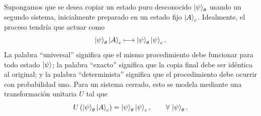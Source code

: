 \documentclass[12pt,a4paper]{article}
\theoremstyle{definition}
\theoremstyle{plain}
\theoremstyle{remark}
\begin{document}
Supongamos que se desea copiar un estado puro desconocido $\ket{\psi}_\theta$ usando un segundo sistema, inicialmente preparado en un estado fijo $\ket{A}_c$. Idealmente, el proceso tendría que actuar como
\begin{equation*}
    \ket{\psi}_\theta\ket{A}_c
    \longmapsto
    \ket{\psi}_\theta\ket{\psi}_c.
\end{equation*}
La palabra ``universal'' significa que el mismo procedimiento debe funcionar para todo estado $\ket{\psi}$; la palabra ``exacto'' significa que la copia final debe ser idéntica al original; y la palabra ``determinista'' significa que el procedimiento debe ocurrir con probabilidad uno. Para un sistema cerrado, esto se modela mediante una transformación unitaria $U$ tal que
\begin{equation*}
    U\left(\ket{\psi}_\theta\ket{A}_c\right)
    =
    \ket{\psi}_\theta\ket{\psi}_c,
    \qquad
    \forall\,\ket{\psi}_\theta.
\end{equation*}
\end{document}
